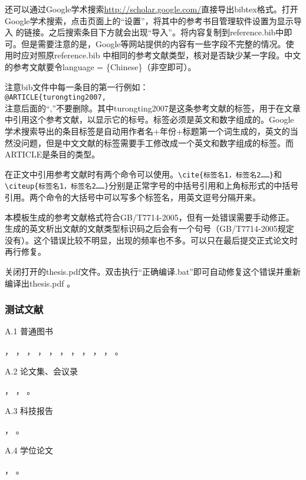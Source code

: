 还可以通过Google学术搜索\url{http://scholar.google.com/}直接导出bibtex格式。打开Google学术搜索，点击页面上的“设置”，将其中的参考书目管理软件设置为显示导入\BibTeX{} 的链接。之后搜索条目下方就会出现“导入\BibTeX{}”。将内容复制到reference.bib中即可。但是需要注意的是，Google等网站提供的内容有一些字段不完整的情况。使用时应对照原reference.bib 中相同的参考文献类型，核对是否缺少某一字段。中文的参考文献要令language = \{Chinese\}（非空即可）。

注意bib文件中每一条目的第一行例如：\\
\verb|@ARTICLE{turongting2007,|\\
注意后面的“,”不要删除。其中turongting2007是这条参考文献的标签，用于在文章中引用这个参考文献，以显示它的标号。标签必须是英文和数字组成的。Google学术搜索导出的条目标签是自动用作者名+年份+标题第一个词生成的，英文的当然没问题，但是中文文献的标签需要手工修改成一个英文和数字组成的标签。而ARTICLE是条目的类型。

在正文中引用参考文献时有两个命令可以使用。\verb|\cite{标签名1，标签名2……}|和\verb|\citeup{标签名1，标签名2……}|分别是正常字号的中括号引用和上角标形式的中括号引用。两个命令的大括号中可以写多个标签名，用英文逗号分隔开来。\par

本模板生成的参考文献格式符合GB/T7714-2005，但有一处错误需要手动修正。生成的英文析出文献的文献类型标识码之后会有一个句号（GB/T7714-2005规定没有）。这个错误比较不明显，出现的频率也不多。可以只在最后提交正式论文时再行修复。

关闭打开的thesis.pdf文件。双击执行“正确编译.bat”即可自动修复这个错误并重新编译出thesis.pdf 。

\subsubsection{测试文献}


A.1 普通图书

\cite{gxzzzzqlyt1993}，
\cite{jiangyouxu1998}，
\cite{tangxujun1999}，
\cite{zhaokaihua1995}，
\cite{wangang1912}，
\cite{zhaoyaodong1998}，
\cite{crawfprd1995}，
\cite{iflai1977}，
\cite{obrien1994}，
\cite{rood2001}，
\cite{angwen1988}。

A.2 论文集、会议录

\cite{zglxxh1990}，
\cite{ROSENTHALL1963}，
\cite{GANZHA2000}。

A.3 科技报告

\cite{dtha1990}，
\cite{who1970}。

A.4 学位论文

\cite{ZHANGZHIXIANG1998}，
\cite{CALMS1965}。

